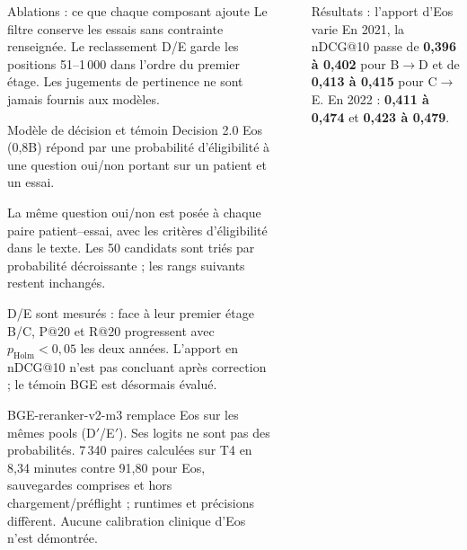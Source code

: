 \documentclass[final]{beamer}
\newlength{\sepwidth}
\newlength{\colwidth}
\newcommand{\separatorcolumn}{\begin{column}{\sepwidth}\end{column}}
\begin{document}
\begin{frame}[t]
\begin{columns}[t]
\begin{column}{\colwidth}
\begin{block}{Ablations : ce que chaque composant ajoute}
Le filtre conserve les essais sans contrainte renseignée. Le reclassement D/E garde les positions 51--1\,000 dans l'ordre du premier étage. Les jugements de pertinence ne sont jamais fournis aux modèles.
\end{block}
\begin{exampleblock}{Modèle de décision et témoin}
Decision 2.0 Eos (0,8B) répond par une probabilité d'éligibilité à une question oui/non portant sur un patient et un essai.

La même question oui/non est posée à chaque paire patient--essai, avec les critères d'éligibilité dans le texte. Les 50 candidats sont triés par probabilité décroissante ; les rangs suivants restent inchangés.

D/E sont mesurés : face à leur premier étage B/C, P@20 et R@20 progressent avec $p_{\mathrm{Holm}}<0{,}05$ les deux années. L'apport en nDCG@10 n'est pas concluant après correction ; le témoin BGE est désormais évalué.

{\small BGE-reranker-v2-m3 remplace Eos sur les mêmes pools (D$'$/E$'$). Ses logits ne sont pas des probabilités. 7\,340 paires calculées sur T4 en 8,34 minutes contre 91,80 pour Eos, sauvegardes comprises et hors chargement/préflight ; runtimes et précisions diffèrent. Aucune calibration clinique d'Eos n'est démontrée.}
\end{exampleblock}
\end{column}
\separatorcolumn
\begin{column}{\colwidth}
\begin{alertblock}{Résultats : l'apport d'Eos varie}
En 2021, la nDCG@10 passe de \textbf{0,396 à 0,402} pour B$\rightarrow$D et de \textbf{0,413 à 0,415} pour C$\rightarrow$E. En 2022 : \textbf{0,411 à 0,474} et \textbf{0,423 à 0,479}.


\end{alertblock}
\end{column}
\end{columns}
\end{frame}
\end{document}
